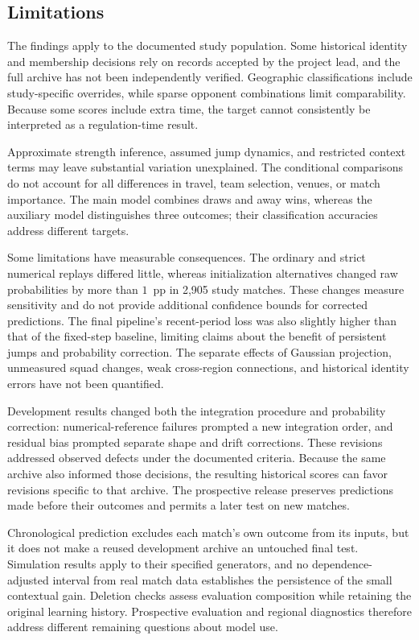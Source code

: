 \subsection{Limitations}

The findings apply to the documented study population. Some historical identity and membership decisions rely on records accepted by the project lead, and the full archive has not been independently verified. Geographic classifications include study-specific overrides, while sparse opponent combinations limit comparability. Because some scores include extra time, the target cannot consistently be interpreted as a regulation-time result.

Approximate strength inference, assumed jump dynamics, and restricted context terms may leave substantial variation unexplained. The conditional comparisons do not account for all differences in travel, team selection, venues, or match importance. The main model combines draws and away wins, whereas the auxiliary model distinguishes three outcomes; their classification accuracies address different targets.

Some limitations have measurable consequences. The ordinary and strict numerical replays differed little, whereas initialization alternatives changed raw probabilities by more than $1$~pp in 2,905 study matches. These changes measure sensitivity and do not provide additional confidence bounds for corrected predictions. The final pipeline's recent-period loss was also slightly higher than that of the fixed-step baseline, limiting claims about the benefit of persistent jumps and probability correction. The separate effects of Gaussian projection, unmeasured squad changes, weak cross-region connections, and historical identity errors have not been quantified.

Development results changed both the integration procedure and probability correction: numerical-reference failures prompted a new integration order, and residual bias prompted separate shape and drift corrections. These revisions addressed observed defects under the documented criteria. Because the same archive also informed those decisions, the resulting historical scores can favor revisions specific to that archive. The prospective release preserves predictions made before their outcomes and permits a later test on new matches.

Chronological prediction excludes each match's own outcome from its inputs, but it does not make a reused development archive an untouched final test. Simulation results apply to their specified generators, and no dependence-adjusted interval from real match data establishes the persistence of the small contextual gain. Deletion checks assess evaluation composition while retaining the original learning history. Prospective evaluation and regional diagnostics therefore address different remaining questions about model use.

